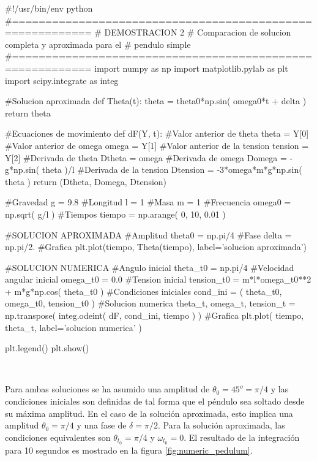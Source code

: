 \begin{listing}[style=python]
#!/usr/bin/env python
#==========================================================
# DEMOSTRACION 2
# Comparacion de solucion completa y aproximada para el 
# pendulo simple
#==========================================================
import numpy as np
import matplotlib.pylab as plt
import scipy.integrate as integ

#Solucion aproximada
def Theta(t):
    theta = theta0*np.sin( omega0*t + delta )
    return theta

#Ecuaciones de movimiento
def dF(Y, t):
    #Valor anterior de theta
    theta = Y[0]
    #Valor anterior de omega
    omega = Y[1]
    #Valor anterior de la tension
    tension = Y[2]
    #Derivada de theta
    Dtheta = omega
    #Derivada de omega
    Domega = -g*np.sin( theta )/l
    #Derivada de la tension
    Dtension = -3*omega*m*g*np.sin( theta )
    return (Dtheta, Domega, Dtension)
    
#Gravedad
g = 9.8
#Longitud
l = 1
#Masa
m = 1
#Frecuencia
omega0 = np.sqrt( g/l )
#Tiempos
tiempo = np.arange( 0, 10, 0.01 )
    
#SOLUCION APROXIMADA
#Amplitud
theta0 = np.pi/4
#Fase
delta = np.pi/2.
#Grafica
plt.plot(tiempo, Theta(tiempo), label='solucion aproximada')

#SOLUCION NUMERICA
#Angulo inicial
theta_t0 = np.pi/4
#Velocidad angular inicial
omega_t0 = 0.0
#Tension inicial
tension_t0 = m*l*omega_t0**2 + m*g*np.cos( theta_t0 )
#Condiciones iniciales
cond_ini = ( theta_t0, omega_t0, tension_t0 )
#Solucion numerica
theta_t, omega_t, tension_t = np.transpose( 
integ.odeint( dF, cond_ini, tiempo ) )
#Grafica
plt.plot( tiempo, theta_t, label='solucion numerica' )

plt.legend()
plt.show()
\end{listing}

\

Para ambas soluciones se ha asumido una amplitud de $\theta_0 = 45^o = 
\pi/4$ y las condiciones iniciales son definidas de tal forma que el 
péndulo sea soltado desde su máxima amplitud. En el caso de la solución 
aproximada, esto implica una amplitud $\theta_0 = \pi/4$ y una fase de 
$\delta = \pi/2$. Para la solución aproximada, las condiciones equivalentes 
son $\theta_{t_0} = \pi/4$ y $\omega_{t_0} = 0$. El resultado de la 
integración para 10 segundos es mostrado en la figura 
\ref{fig:numeric_pedulum}.

